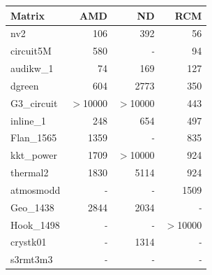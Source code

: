 \begin{table}[htbp]
  \centering
  \label{tab:breakeven_x86}
  \begin{tabular}{lrrr}
    \toprule
    \textbf{Matrix} & \textbf{AMD} & \textbf{ND} & \textbf{RCM}  \\
    \midrule
    nv2 & 106 & 392 & 56 \\
    circuit5M & 580 & \textit{ - } & 94 \\
    audikw\_1 & 74 & 169 & 127 \\
    dgreen & 604 & 2773 & 350 \\
    G3\_circuit & $>$10000 & $>$10000 & 443 \\
    inline\_1 & 248 & 654 & 497 \\
    Flan\_1565 & 1359 & \textit{ - } & 835 \\
    kkt\_power & 1709 & $>$10000 & 924 \\
    thermal2 & 1830 & 5114 & 924 \\
    atmosmodd & \textit{ - } & \textit{ - } & 1509 \\
    Geo\_1438 & 2844 & 2034 & \textit{ - } \\
    Hook\_1498 & \textit{ - } & \textit{ - } & $>$10000 \\
    crystk01 & \textit{ - } & 1314 & \textit{ - } \\
    s3rmt3m3 & \textit{ - } & \textit{ - } & \textit{ - } \\
    \bottomrule
  \end{tabular}
\end{table}